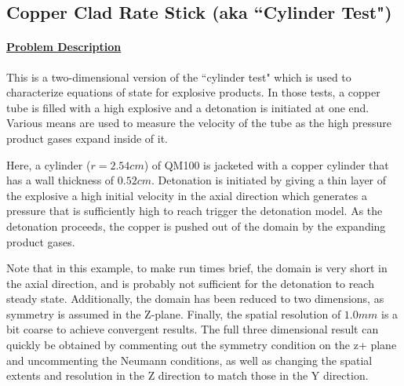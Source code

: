 \subsection*{\center Copper Clad Rate Stick (aka ``Cylinder Test")}
\paragraph*{\underline{Problem Description}}

This is a two-dimensional version of the ``cylinder test" which is used to
characterize equations of state for explosive products.  In those tests, a
copper tube is filled with a high explosive and a detonation is initiated
at one end.  Various means are used to measure the velocity of the tube as
the high pressure product gases expand inside of it.

Here, a cylinder ($r=2.54 cm$) of QM100 is jacketed with a copper cylinder
that has a wall thickness of $0.52 cm.$   Detonation is initiated by giving
a thin layer of the explosive a high initial velocity in the axial direction
which generates a pressure that is sufficiently high to reach trigger the
detonation model.  As the detonation proceeds, the copper is pushed out of
the domain by the expanding product gases.

Note that in this example, to make run times brief, the domain is very short
in the axial direction, and is probably not sufficient for the detonation to
reach steady state.  Additionally, the domain has been reduced to two
dimensions, as symmetry is assumed in the Z-plane.  Finally, the spatial
resolution of $1.0 mm$ is a bit coarse to achieve 
convergent results.  The full three dimensional result can quickly be
obtained by commenting out the symmetry condition on the z+ plane and
uncommenting the Neumann conditions, as well as changing the spatial extents
and resolution in the Z direction to match those in the Y direction.

%
